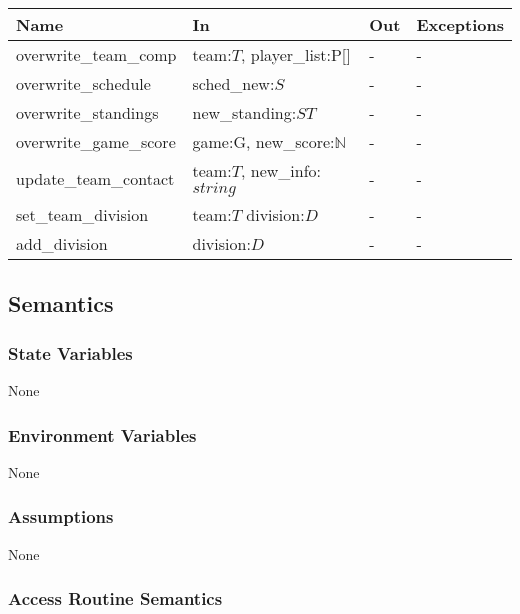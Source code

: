\documentclass[12pt, titlepage]{article}
\begin{document}
\begin{center}
\begin{tabular}{p{5cm} p{4cm} p{4cm} p{2cm}}
\hline
\textbf{Name} & \textbf{In} & \textbf{Out} & \textbf{Exceptions} \\
\hline
overwrite\_team\_comp & team:$T$, player\_list:P[] & - & - \\
overwrite\_schedule & sched\_new:$S$ & - & - \\
overwrite\_standings & new\_standing:$ST$ & - & - \\
overwrite\_game\_score & game:G, new\_score:$\mathbb{N}$ & - & - \\
update\_team\_contact & team:$T$, new\_info:$string$ & - & - \\
set\_team\_division & team:$T$ division:$D$ & - & - \\
add\_division & division:$D$ & - & - \\

\hline
\end{tabular}
\end{center}

\subsection{Semantics}

\subsubsection{State Variables}

None

\subsubsection{Environment Variables}

None

\subsubsection{Assumptions}


None

\subsubsection{Access Routine Semantics}
\end{document}
